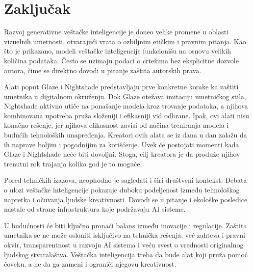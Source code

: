 \section{Zaključak}

Razvoj generativne veštačke inteligencije je doneo velike promene u oblasti vizuelnih umetnosti, otvarajući vrata o ozbiljnim etičkim i pravnim pitanja. Kao što je prikazano, modeli veštačke inteligencije funkcionišu na osnovu velikih količina podataka. Često se uzimaju podaci o crtežima bez eksplicitne dozvole autora, čime se direktno dovodi u pitanje zaštita autorskih prava.

Alati poput Glaze i Nightshade predstavljaju prve konkretne korake ka zaštiti umetnika u digitalnom okruženju. Dok Glaze otežava imitaciju umetničkog stila, Nightshade aktivno utiče na ponašanje modela kroz trovanje podataka, a njihova kombinovana upotreba pruža složeniji i efikasniji vid odbrane. Ipak, ovi alati nisu konačno rešenje, jer njihova efikasnost zavisi od načina treniranja modela i budućih tehnoloških unapređenja. Kreatori ovih alata se iz dana u dan zalažu da ih naprave boljim i pogodnijim za korišćenje. Uvek će postojati momenti kada Glaze i Nightshade neće biti dovoljni. Stoga, cilj kreatora je da produže njihov trenutni rok trajanja koliko god je to moguće.

Pored tehničkih izazova, neophodno je sagledati i širi društveni kontekst. Debata o ulozi veštačke inteligencije pokazuje duboku podeljenost između tehnološkog napretka i očuvanja ljudske kreativnosti. Dovodi se u pitanje i ekološke posledice nastale od strane infrastruktura koje podržavaju AI sisteme.

U budućnosti će biti ključno pronaći balans između inovacije i regulacije. Zaštita umetnika se ne može osloniti isključivo na tehnička rešenja, već zahteva i pravni okvir, transparentnost u razvoju AI sistema i veću svest o vrednosti originalnog ljudskog stvaralaštva. Veštačka inteligencija treba da bude alat koji pruža pomoć čoveku, a ne da ga zameni i ograniči njegovu kreativnost.
